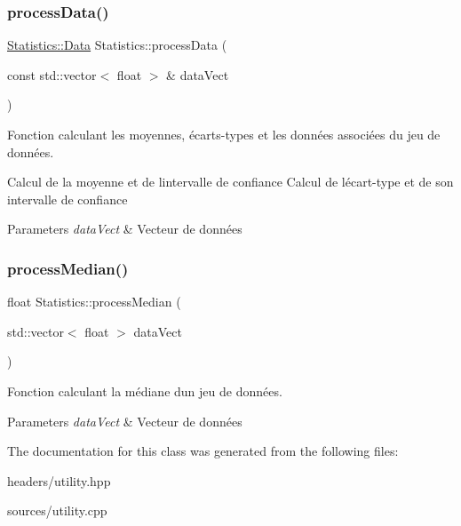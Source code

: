 \subsubsection{\texorpdfstring{process\+Data()}{processData()}}
{\footnotesize\ttfamily \hyperlink{structStatistics_1_1Data}{Statistics\+::\+Data} Statistics\+::process\+Data (\begin{DoxyParamCaption}\item[{const std\+::vector$<$ float $>$ \&}]{data\+Vect }\end{DoxyParamCaption})\hspace{0.3cm}{\ttfamily [static]}}



Fonction calculant les moyennes, écarts-\/types et les données associées du jeu de données. 

Calcul de la moyenne et de l\textquotesingle{}intervalle de confiance Calcul de l\textquotesingle{}écart-\/type et de son intervalle de confiance 
\begin{DoxyParams}{Parameters}
{\em data\+Vect} & Vecteur de données \\
\hline
\end{DoxyParams}
\mbox{\label{classStatistics_ae1c12077162711aa0ea8b4ee6e15b4da}} 
\subsubsection{\texorpdfstring{process\+Median()}{processMedian()}}
{\footnotesize\ttfamily float Statistics\+::process\+Median (\begin{DoxyParamCaption}\item[{std\+::vector$<$ float $>$}]{data\+Vect }\end{DoxyParamCaption})\hspace{0.3cm}{\ttfamily [static]}}



Fonction calculant la médiane d\textquotesingle{}un jeu de données. 


\begin{DoxyParams}{Parameters}
{\em data\+Vect} & Vecteur de données \\
\hline
\end{DoxyParams}


The documentation for this class was generated from the following files\+:\begin{DoxyCompactItemize}
\item 
headers/utility.\+hpp\item 
sources/utility.\+cpp\end{DoxyCompactItemize}
